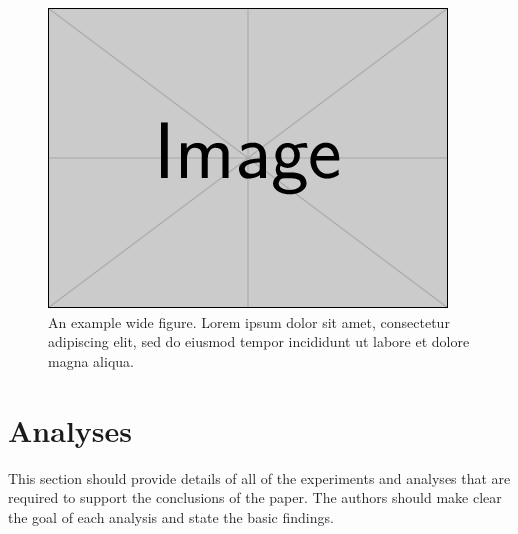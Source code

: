 \documentclass[a4paper,num-refs]{oup-contemporary}
\begin{document}
\begin{figure}%
\centering
\includegraphics[width=.7\textwidth]{example-image}
\caption{An example wide figure. Lorem ipsum dolor sit amet, consectetur adipiscing elit, sed do eiusmod tempor incididunt ut labore et dolore magna aliqua.
}\label{fig:example:wide}
\end{figure}


\section{Analyses}

This section should provide details of all of the experiments and analyses that are required to support the conclusions of the paper. The authors should make clear the goal of each analysis and state the basic findings.
\end{document}
